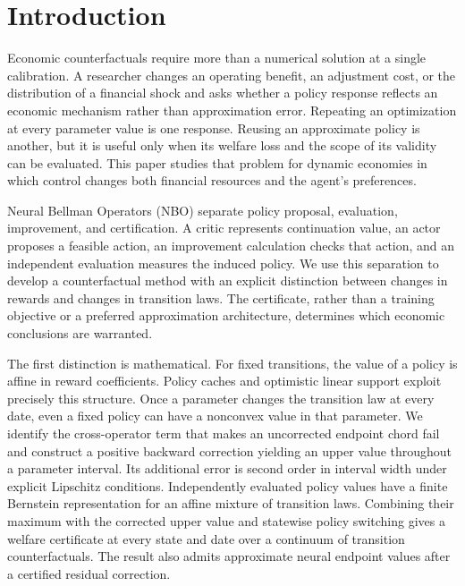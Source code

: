 \section{Introduction}
Economic counterfactuals require more than a numerical solution at a single calibration. A researcher changes an operating benefit, an adjustment cost, or the distribution of a financial shock and asks whether a policy response reflects an economic mechanism rather than approximation error. Repeating an optimization at every parameter value is one response. Reusing an approximate policy is another, but it is useful only when its welfare loss and the scope of its validity can be evaluated. This paper studies that problem for dynamic economies in which control changes both financial resources and the agent's preferences.

Neural Bellman Operators (NBO) separate policy proposal, evaluation, improvement, and certification. A critic represents continuation value, an actor proposes a feasible action, an improvement calculation checks that action, and an independent evaluation measures the induced policy. We use this separation to develop a counterfactual method with an explicit distinction between changes in rewards and changes in transition laws. The certificate, rather than a training objective or a preferred approximation architecture, determines which economic conclusions are warranted.

The first distinction is mathematical. For fixed transitions, the value of a policy is affine in reward coefficients. Policy caches and optimistic linear support exploit precisely this structure. Once a parameter changes the transition law at every date, even a fixed policy can have a nonconvex value in that parameter. We identify the cross-operator term that makes an uncorrected endpoint chord fail and construct a positive backward correction yielding an upper value throughout a parameter interval. Its additional error is second order in interval width under explicit Lipschitz conditions. Independently evaluated policy values have a finite Bernstein representation for an affine mixture of transition laws. Combining their maximum with the corrected upper value and statewise policy switching gives a welfare certificate at every state and date over a continuum of transition counterfactuals. The result also admits approximate neural endpoint values after a certified residual correction.

